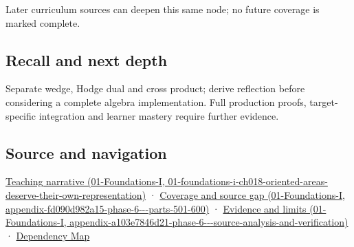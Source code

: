 Later curriculum sources can deepen this same node; no future coverage is marked complete.

\subsection{Recall and next depth}\label{appendix-e1960925d1b8-recall-and-next-depth}

Separate wedge, Hodge dual and cross product; derive reflection before considering a complete algebra implementation. Full production proofs, target-specific integration and learner mastery require further evidence.

\subsection{Source and navigation}\label{appendix-e1960925d1b8-source-and-navigation}

\href{../01-Foundations-I/main.pdf\#nameddest=01-foundations-i-ch018-oriented-areas-deserve-their-own-representation}{Teaching narrative (01-Foundations-I, 01-foundations-i-ch018-oriented-areas-deserve-their-own-representation)} · \href{../01-Foundations-I/main.pdf\#nameddest=appendix-fd090d982a15-phase-6---parts-501-600}{Coverage and source gap (01-Foundations-I, appendix-fd090d982a15-phase-6-\/-\/-parts-501-600)} · \href{../01-Foundations-I/main.pdf\#nameddest=appendix-a103e7846d21-phase-6---source-analysis-and-verification}{Evidence and limits (01-Foundations-I, appendix-a103e7846d21-phase-6-\/-\/-source-analysis-and-verification)} · \hyperref[appendix-4ad47bdd269a]{Dependency Map}
